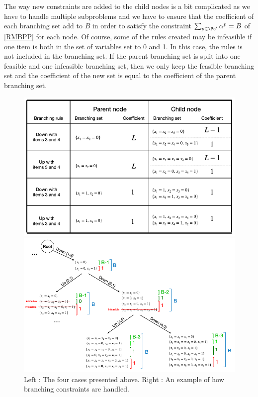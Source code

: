 The way new constraints are added to the child nodes is a bit complicated as we have to handle multiple subproblems and we have to ensure that the coefficient of each branching set add to $B$ in order to satisfy the constraint $\sum_{p \in \Pc'} \alpha^p = B$ of \eqref{RMBPP} for each node. Of course, some of the rules created may be infeasible if one item is both in the set of variables set to 0 and 1. In this case, the rules is not included in the branching set. If the parent branching set is split into one feasible and one infeasible branching set, then we only keep the feasible branching set and the coefficient of the new set is equal to the coefficient of the parent branching set.
\begin{figure}[!ht]
	\centering
	\begin{minipage}{0.47\linewidth}
		\centering
		\includegraphics[width=0.7\linewidth]{img/generic-branching.png}
	\end{minipage}
	\begin{minipage}{0.47\linewidth}
		\centering
		\includegraphics[width=\linewidth]{img/generic-example.png}
	\end{minipage}
	\caption{Left : The four cases presented above. Right : An example of how branching constraints are handled.}
\end{figure}

